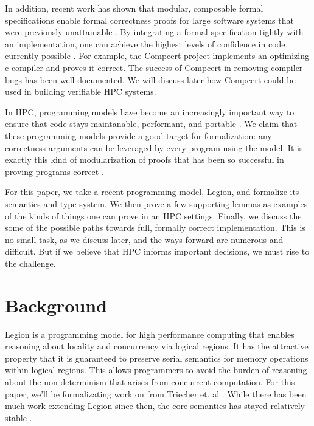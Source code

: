 \documentclass[sigconf]{acmart}
\begin{document}
In addition, recent work has shown that modular, composable formal
specifications enable formal correctness proofs for large software systems that
were previously unattainable \cite{?}. By integrating a formal specification
tightly with an implementation, one can achieve the highest levels of
confidence in code currently possible \cite{?}. For example, the Compcert
project implements an optimizing c compiler and proves it correct. The success
of Compcert in removing compiler bugs has been well documented. We will discuss
later how Compcert could be used in building verifiable HPC systems.

In HPC, programming models have become an increasingly important way to ensure
that code stays maintanable, performant, and portable \cite{?}. We claim that
these programming models provide a good target for formalization: any
correctness arguments can be leveraged by every program using the model. It is
exactly this kind of modularization of proofs that has been so successful in
proving programs correct \cite{?}.

For this paper, we take a recent programming model, Legion, and formalize its
semantics and type system. We then prove a few supporting lemmas as examples of
the kinds of things one can prove in an HPC settings. Finally, we discuss the
some of the possible paths towards full, formally correct implementation. This
is no small task, as we discuss later, and the ways forward are numerous and
difficult. But if we believe that HPC informs important decisions, we must
rise to the challenge.

\section{Background}

Legion is a programming model for high performance computing that enables
reasoning about locality and concurrency via logical regions. It has the
attractive property that it is guaranteed to preserve serial semantics for
memory operations within logical regions. This allows programmers to avoid the
burden of reasoning about the non-determinism that arises from concurrent
computation. For this paper, we'll be formalizating work on from Triecher et.
al \cite{ooplsa13}. While there has been much work extending Legion since then,
the core semantics has stayed relatively stable \cite{regent, deppart}. 
\end{document}
